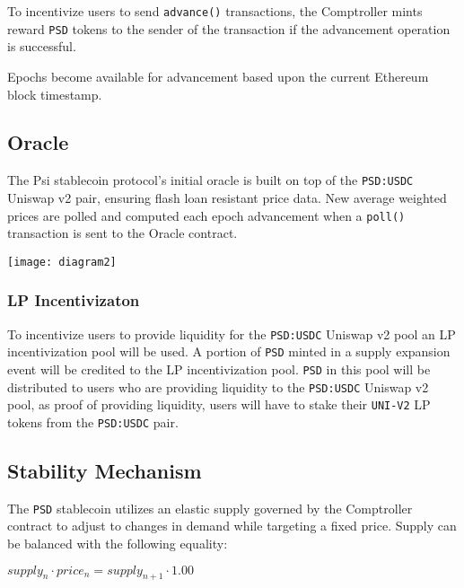 \documentclass[a4paper, 12pt]{article}
\begin{document}
	To incentivize users to send \texttt{advance()} transactions, the Comptroller mints reward \texttt{PSD} tokens to the sender of the transaction if the advancement operation is successful.
	
	Epochs become available for advancement based upon the current Ethereum block timestamp.

	\subsection{Oracle}
	The Psi stablecoin protocol's initial oracle is built on top of the \texttt{PSD:USDC} Uniswap v2 pair, ensuring flash loan resistant price data. New average weighted prices are polled and computed each epoch advancement when a \texttt{poll()} transaction is sent to the Oracle contract.

	\begin{center}

		\texttt{[image: diagram2]}
	
	\end{center}
	
	\subsubsection{LP Incentivizaton}
	To incentivize users to provide liquidity for the \texttt{PSD:USDC} Uniswap v2 pool an LP incentivization pool will be used. A portion of \texttt{PSD} minted in a supply expansion event will be credited 			to the LP incentivization pool. \texttt{PSD} in this pool will be distributed to users who are providing liquidity to the \texttt{PSD:USDC} Uniswap v2 pool, as proof of providing liquidity, users will have 			to stake their \texttt{UNI-V2} LP tokens from the \texttt{PSD:USDC} pair.


	\subsection{Stability Mechanism}
	The \texttt{PSD} stablecoin utilizes an elastic supply governed by the Comptroller contract to adjust to changes in demand while targeting a fixed price. Supply can be balanced with the following 			equality:
	
	\begin{center}

		$supply_n \cdot price_n = supply_{n + 1} \cdot 1.00$
	
	\end{center}
\end{document}
